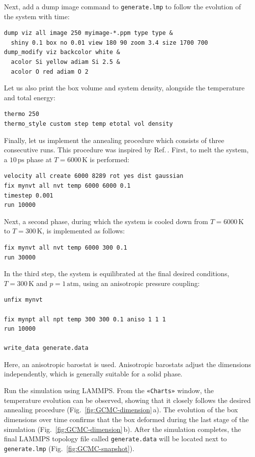 \documentclass[9pt,tutorial]{livecoms}
\newcommand{\lmpcmd}[1]{\hspace{0pt}\colorbox{listing}{\textcolor{command}{\small{#1}}}\hspace{0pt}} %
\newcommand{\flecmd}[1]{\textcolor{command}{\texttt{#1}}} %
\newcommand{\guicmd}[1]{\textcolor{command}{\texttt{«#1»}}} %
\begin{document}
Next, add a \lmpcmd{dump image} command to \flecmd{generate.lmp} to follow the
evolution of the system with time:
\begin{lstlisting}
dump viz all image 250 myimage-*.ppm type type &
  shiny 0.1 box no 0.01 view 180 90 zoom 3.4 size 1700 700
dump_modify viz backcolor white &
  acolor Si yellow adiam Si 2.5 &
  acolor O red adiam O 2
\end{lstlisting}
Let us also print the box volume and system density, alongside the
temperature and total energy:
\begin{lstlisting}
thermo 250
thermo_style custom step temp etotal vol density
\end{lstlisting}

Finally, let us implement the annealing procedure which
consists of three consecutive runs.  This procedure was inspired
by Ref.\,\cite{della1992molecular}.  First, to melt the system,
a $10\,\text{ps}$ phase at $T = 6000\,\text{K}$ is performed:
\begin{lstlisting}
velocity all create 6000 8289 rot yes dist gaussian
fix mynvt all nvt temp 6000 6000 0.1
timestep 0.001
run 10000
\end{lstlisting}
Next, a second phase, during which the system is cooled down from $T = 6000\,\text{K}$
to $T = 300\,\text{K}$, is implemented as follows:
\begin{lstlisting}
fix mynvt all nvt temp 6000 300 0.1
run 30000
\end{lstlisting}
In the third step, the system is equilibrated at the final desired
conditions, $T = 300\,\text{K}$ and $p = 1\,\text{atm}$,
using an anisotropic pressure coupling:
\begin{lstlisting}
unfix mynvt

fix mynpt all npt temp 300 300 0.1 aniso 1 1 1
run 10000

write_data generate.data
\end{lstlisting}
Here, an anisotropic barostat is used.
Anisotropic barostats adjust the dimensions independently, which is
generally suitable for a solid phase.

Run the simulation using LAMMPS.  From the \guicmd{Charts} window, the temperature
evolution can be observed, showing that it closely follows the desired annealing procedure (Fig.~\ref{fig:GCMC-dimension}\,a).
The evolution of the box dimensions over time confirms that the box
deformed during the last stage of the simulation
(Fig.~\ref{fig:GCMC-dimension}\,b).  After the simulation completes, the final
LAMMPS topology file called \flecmd{generate.data}
will be located next to \flecmd{generate.lmp} (Fig.~\ref{fig:GCMC-snapshot}).
\end{document}
